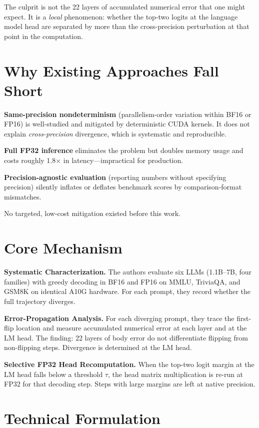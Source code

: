 \documentclass[10pt,twocolumn]{article}
\begin{document}
The culprit is not the 22 layers of accumulated numerical error that one
might expect. It is a \emph{local} phenomenon: whether the top-two logits
at the language model head are separated by more than the cross-precision
perturbation at that point in the computation.

\section{Why Existing Approaches Fall Short}

\textbf{Same-precision nondeterminism} (parallelism-order variation within
BF16 or FP16) is well-studied and mitigated by deterministic CUDA kernels.
It does not explain \emph{cross-precision} divergence, which is systematic
and reproducible.

\textbf{Full FP32 inference} eliminates the problem but doubles memory usage
and costs roughly 1.8$\times$ in latency---impractical for production.

\textbf{Precision-agnostic evaluation} (reporting numbers without specifying
precision) silently inflates or deflates benchmark scores by comparison-format
mismatches.

No targeted, low-cost mitigation existed before this work.

\section{Core Mechanism}

\textbf{Systematic Characterization.} The authors evaluate six LLMs
(1.1B--7B, four families) with greedy decoding in BF16 and FP16 on MMLU,
TriviaQA, and GSM8K on identical A10G hardware. For each prompt, they record
whether the full trajectory diverges.

\textbf{Error-Propagation Analysis.} For each diverging prompt, they trace
the first-flip location and measure accumulated numerical error at each layer
and at the LM head. The finding: 22 layers of body error do not differentiate
flipping from non-flipping steps. Divergence is determined at the LM head.

\textbf{Selective FP32 Head Recomputation.} When the top-two logit margin
at the LM head falls below a threshold $\tau$, the head matrix multiplication
is re-run at FP32 for that decoding step. Steps with large margins are left
at native precision.

\section{Technical Formulation}
\end{document}

